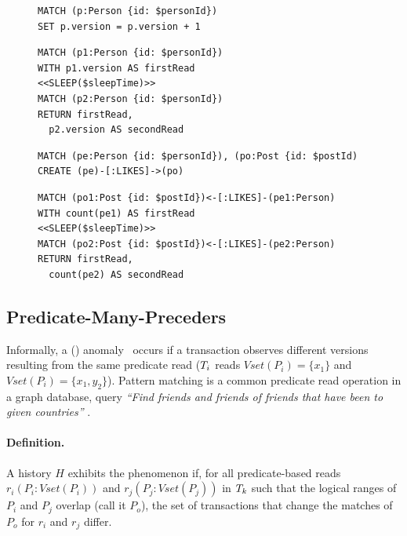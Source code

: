 \begin{figure}[htb]
\centering
\begin{minipage}{0.35\linewidth}
\begin{lstlisting}[language=cypher,label=fig:ic1,caption=\tx{IMP $T_\mathrm{W}$}.]
MATCH (p:Person {id: $personId})
SET p.version = p.version + 1
\end{lstlisting}
\begin{lstlisting}[language=cypher,label=fig:ic2,caption=\tx{IMP $T_\mathrm{R}$}.]
MATCH (p1:Person {id: $personId})
WITH p1.version AS firstRead
<<SLEEP($sleepTime)>>
MATCH (p2:Person {id: $personId})
RETURN firstRead,
  p2.version AS secondRead
\end{lstlisting}
\end{minipage}
\quad
\begin{minipage}{0.61\linewidth}
\begin{lstlisting}[language=cypher,label=fig:pc1,caption=\tx{PMP $T_\mathrm{W}$}.]
MATCH (pe:Person {id: $personId}), (po:Post {id: $postId)
CREATE (pe)-[:LIKES]->(po)
\end{lstlisting}
\begin{lstlisting}[language=cypher,label=fig:pc2,caption=\tx{PMP $T_\mathrm{R}$}.]
MATCH (po1:Post {id: $postId})<-[:LIKES]-(pe1:Person)
WITH count(pe1) AS firstRead
<<SLEEP($sleepTime)>>
MATCH (po2:Post {id: $postId})<-[:LIKES]-(pe2:Person)
RETURN firstRead,
  count(pe2) AS secondRead
\end{lstlisting}
\end{minipage}
\end{figure}

\subsection*{Predicate-Many-Preceders}

Informally, a  () anomaly~\cite{DBLP:journals/pvldb/BailisDFGHS13} occurs if a transaction observes different versions resulting from the same predicate read
(\eg $T_i$ reads
$\textit{Vset}(P_i) =  \{x_1\}$ and
$\textit{Vset}(P_i) = \{x_1,y_2\}$).
Pattern matching is a common predicate read operation in a graph database, \eg query \emph{``Find friends and friends of friends that have been to given countries''} .

\paragraph{Definition.}
A history $H$ exhibits the phenomenon  if, for all predicate-based reads $r_i(P_i : \textit{Vset}(P_i))$ and $r_j(P_j : \textit{Vset}(P_j))$ in $T_k$ such that the logical ranges of $P_i$ and $P_j$ overlap (call it $P_o$), the set of transactions that change the matches of $P_o$ for $r_i$ and $r_j$ differ.

